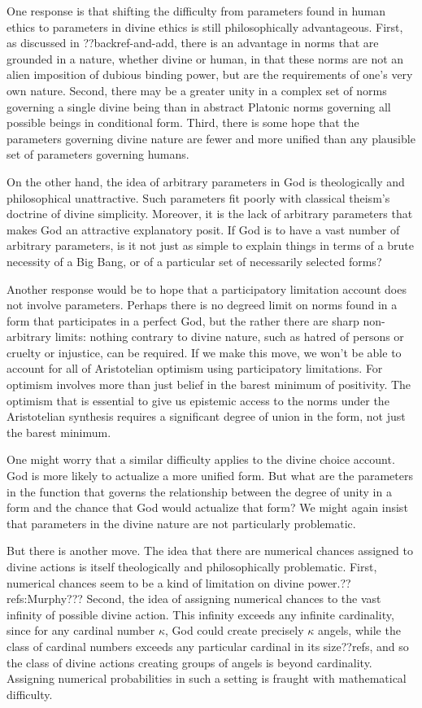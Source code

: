One response is that shifting the difficulty from parameters found in human ethics to parameters in divine ethics is still philosophically
advantageous. First, as discussed in ??backref-and-add, there is an advantage in norms that are grounded in a nature, whether divine or human, 
in that these norms are not an alien imposition of dubious binding power, but are the requirements of one's very own nature. Second, there may
be a greater unity in a complex set of norms governing a single divine being than in abstract Platonic norms governing all possible beings
in conditional form. Third, there is some hope that the parameters governing divine nature are fewer and more unified than any plausible set 
of parameters governing humans. 

On the other hand, the idea of arbitrary parameters in God is theologically and philosophical unattractive. Such parameters fit poorly 
with classical theism's doctrine of divine simplicity. Moreover, it is the lack of arbitrary parameters that makes God an attractive 
explanatory posit. If God is to have a vast number of arbitrary parameters, is it not just as simple to explain things in terms of 
a brute necessity of a Big Bang, or of a particular set of necessarily selected forms? 

Another response would be to hope that a participatory limitation account does not involve parameters. Perhaps there is no degreed
limit on norms found in a form that participates in a perfect God, but the rather there are sharp non-arbitrary limits: 
nothing contrary to divine nature, such as hatred of persons or cruelty or injustice, can be required. If we make this move, we 
won't be able to account for all of Aristotelian optimism using participatory limitations. For optimism involves more than just belief
in the barest minimum of positivity. The optimism that is essential to give us epistemic access to the norms under the Aristotelian 
synthesis requires a significant degree of union in the form, not just the barest minimum.

One might worry that a similar difficulty applies to the divine choice account. God is more likely to actualize a more unified 
form. But what are the parameters in the function that governs the relationship between the degree of unity in a form and the chance that 
God would actualize that form? We might again insist that parameters in the divine nature are not particularly problematic.

But there is another move. The idea that there are numerical chances assigned to divine actions is itself theologically and philosophically
problematic. First, numerical chances seem to be a kind of limitation on divine power.??refs:Murphy??? Second, the idea of assigning 
numerical chances to the vast infinity of possible divine action. This infinity exceeds any infinite cardinality, since for any
cardinal number $\kappa$, God could create precisely $\kappa$ angels, while the class of cardinal numbers exceeds any particular cardinal 
in its size??refs, and so the class of divine actions creating groups of angels is beyond cardinality. Assigning numerical probabilities 
in such a setting is fraught with mathematical difficulty. 

